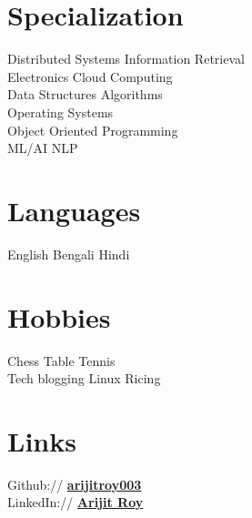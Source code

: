 \documentclass[]{deedy-resume-reversed}
\begin{document}
\begin{multicols}{2}
\sectionsep




\needspace{2cm}
\section{Specialization}
\needspace{5cm}
\needspace{10cm}
Distributed Systems  \textbullet{} Information Retrieval \\
Electronics \textbullet{} Cloud Computing \\
Data Structures Algorithms \\
Operating Systems \\
Object Oriented Programming \\
ML/AI \textbullet{} NLP \\
\sectionsep


\needspace{1.5cm}
\section{Languages}
English \textbullet{} Bengali \textbullet{} Hindi
\sectionsep

\needspace{1.5cm}
\section{Hobbies}
Chess \textbullet{} Table Tennis \\
Tech blogging \textbullet{} Linux Ricing
\sectionsep

\needspace{1.5cm}
\section{Links}
Github:// \href{https://github.com/arijitroy003}{\bf arijitroy003} \\
LinkedIn://  \href{https://www.linkedin.com/in/sudo-kill}{\bf Arijit Roy}
\sectionsep

\end{multicols}
\end{document}
